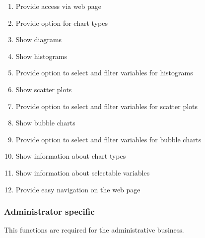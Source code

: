 \begin{enumerate}
  \item Provide access via web page \label{f1}
    
  \item Provide option for chart types \label{f2}
  
  \item Show diagrams \label{f3}
  
  \item Show histograms \label{f4} %
    
  
  \item Provide option to select and filter variables for histograms \label{f6}
  
  
  \item Show scatter plots \label{f7} %
  
  
  \item Provide option to select and filter variables for scatter plots \label{f9} 
  
  \item Show bubble charts \label{f10} %
  
 \item Provide option to select and filter variables for bubble charts \label{f11}
  
  
  \item Show information about chart types \label{f13}
  
  \item Show information about selectable variables\label{f14}
  
  \item Provide easy navigation on the web page \label{f141}
  
\end{enumerate}


\subsubsection*{Administrator specific}
This functions are required for the administrative business.

